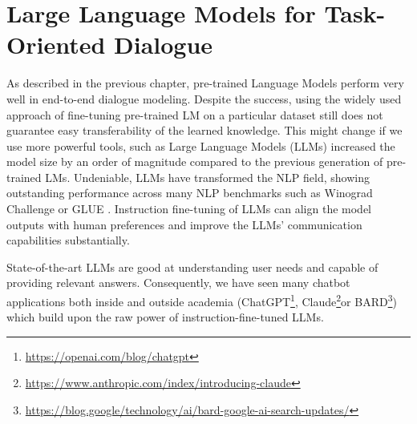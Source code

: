 \chapter{Large Language Models for Task-Oriented Dialogue}
\label{chap:llms}

\label{07:sec:intro}
As described in the previous chapter, pre-trained Language Models perform very well in end-to-end dialogue modeling.
Despite the success, using the widely used approach of fine-tuning pre-trained LM on a particular dataset still does not guarantee easy transferability of the learned knowledge.
This might change if we use more powerful tools, such as 
Large Language Models (LLMs) increased the model size by an order of magnitude compared to the previous generation of pre-trained LMs.
Undeniable, LLMs have transformed the NLP field,
showing outstanding performance across many NLP benchmarks such as Winograd Challenge \cite{levesque2012winograd} or GLUE \cite{wang2018glue}.
Instruction fine-tuning of LLMs can align the model outputs with human preferences \cite{ouyang2022training,supernaturalinstructions} and improve the LLMs' communication capabilities substantially.

State-of-the-art LLMs are good at understanding user needs and capable of providing relevant answers.
Consequently, we have seen many chatbot applications both inside and outside academia (ChatGPT\footnote{\url{https://openai.com/blog/chatgpt}}, Claude\footnote{\url{https://www.anthropic.com/index/introducing-claude}}or BARD\footnote{\url{https://blog.google/technology/ai/bard-google-ai-search-updates/}}) which build upon the raw power of instruction-fine-tuned LLMs.


